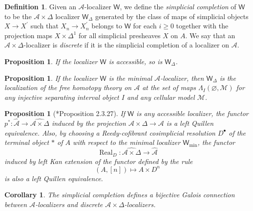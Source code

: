 \documentclass[a4paper]{article}
\numberwithin{equation}{subsection}
\theoremstyle{plain}   %
\newtheorem{prop}[equation]{Proposition}
\newtheorem{cor}[equation]{Corollary}
\theoremstyle{definition}
\newtheorem{defn}[equation]{Definition}
\theoremstyle{remark}
\theoremstyle{plain}
\newcommand{\psh}[1]{\ensuremath{\widehat{#1}}}
\begin{document}
\begin{defn}
	Given an \(\mathcal{A}\)-localizer \(\mathsf{W}\), we define the \emph{simplicial completion} of \(\mathsf{W}\) to be the \(\mathcal{A}\times \Delta\) localizer \(\mathsf{W}_\Delta\) generated by the class of maps of simplicial objects \(X\to X^\prime\) such that \(X_n \to X^\prime_n\) belongs to \(\mathsf{W}\) for each \(i\geq 0\) together with the projection maps \(X\times \Delta^1\) for all simplicial presheaves \(X\) on \(A\).  We say that an \(\mathcal{A}\times \Delta\)-localizer is \emph{discrete} if it is the simplicial completion of a localizer on \(\mathcal{A}\).  
\end{defn}
\begin{prop}
	If the localizer \(\mathsf{W}\) is accessible, so is \(\mathsf{W}_\Delta\).  
\end{prop}
\begin{prop}
	If the localizer \(\mathsf{W}\) is the minimal \(\mathcal{A}\)-localizer, then \(\mathsf{W}_\Delta\) is the localization of the free homotopy theory on \(\mathcal{A}\) at the set of maps \(\Lambda_I(\varnothing,\mathscr{M})\) for any injective separating interval object \(I\) and any cellular model \(\mathscr{M}\).  
\end{prop}
\begin{prop}[\cite{cisinski-book}*{Proposition 2.3.27}]
	If \(\mathsf{W}\) is any accessible localizer, the functor \(p^\ast:\psh{\mathcal{A}} \to \psh{\mathcal{A}\times \Delta}\) induced by the projection \(\mathcal{A}\times \Delta \to \mathcal{A}\) is a left Quillen equivalence.  Also, by choosing a Reedy-cofibrant cosimplicial resolution \(D^\bullet\) of the terminal object \(\ast\) of \(A\) with respect to the minimal localizer \(\mathsf{W}_{\mathrm{min}}\), the functor 
	\[
		\operatorname{Real}_D: \psh{\mathcal{A}\times \Delta} \to \psh{\mathcal{A}}
	\]
	induced by left Kan extension of the functor defined by the rule
	\[
		(A,[n])\mapsto A\times D^n
	\]
	is also a left Quillen equivalence.  
\end{prop}
\begin{cor}
	The simplicial completion defines a bijective Galois connection between \(\mathcal{A}\)-localizers and discrete \(\mathcal{A}\times \Delta\)-localizers.
\end{cor}
\end{document}
